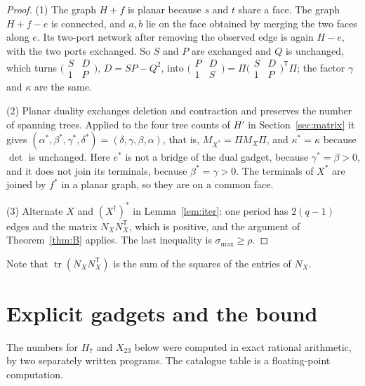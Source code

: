 \documentclass[11pt]{amsart}
\theoremstyle{plain}
\theoremstyle{definition}
\theoremstyle{remark}
\newcommand{\T}{\mathsf{T}}
\begin{document}
\begin{proof}
(1) The graph $H+f$ is planar because $s$ and $t$ share a face. The graph $H+f-e$ is connected, and $a,b$ lie on
the face obtained by merging the two faces along $e$. Its
two-port network after removing the observed edge is again $H-e$, with the two ports exchanged. So $S$ and $P$
are exchanged and $Q$ is unchanged, which turns $\bigl(\begin{smallmatrix}S&D\\1&P\end{smallmatrix}\bigr)$,
$D=SP-Q^2$, into $\bigl(\begin{smallmatrix}P&D\\1&S\end{smallmatrix}\bigr)=\Pi
\bigl(\begin{smallmatrix}S&D\\1&P\end{smallmatrix}\bigr)^{\!\T}\Pi$; the factor $\gamma$ and $\kappa$ are the
same.

(2) Planar duality exchanges deletion and contraction and preserves the number of spanning trees. Applied to the
four tree counts of $H'$ in Section~\ref{sec:matrix} it gives
$(\alpha^\ast,\beta^\ast,\gamma^\ast,\delta^\ast)=(\delta,\gamma,\beta,\alpha)$, that is,
$M_{X^\ast}=\Pi M_X\Pi$, and $\kappa^\ast=\kappa$ because $\det$ is unchanged. Here $e^\ast$ is not a bridge of the
dual gadget, because $\gamma^\ast=\beta>0$, and it does not join its terminals, because $\beta^\ast=\gamma>0$. The
terminals of $X^\ast$ are joined by $f^\ast$ in a planar graph, so they are on a common face.

(3) Alternate $X$ and $(X^\dagger)^\ast$ in Lemma~\ref{lem:iter}: one period has $2(q-1)$ edges and the matrix
$N_XN_X^{\T}$, which is positive, and the argument of Theorem~\ref{thm:B} applies. The last inequality is
$\sigma_{\max}\ge\rho$.
\end{proof}

Note that $\operatorname{tr}(N_XN_X^{\T})$ is the sum of the squares of the entries of $N_X$.

\section{Explicit gadgets and the bound}\label{sec:numbers}

The numbers for $H_7$ and $X_{23}$ below were computed in exact rational arithmetic, by two separately written
programs. The catalogue table is a floating-point computation.
\end{document}
